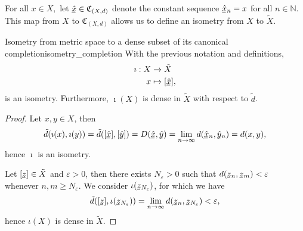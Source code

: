 For all \(x \in X,\) let \(\sequnder{\hat{x}} \in \mathfrak{C}_{(X,d)}\) denote the constant sequence \(\sequnder{\hat{x}}_n = x\) for all \(n \in \mathbb{N}\). This map from \(X\) to \(\mathfrak{C}_{(X,d)}\) allows us to define an isometry from \(X\) to \(\tilde{X}\).
\begin{lemma}{Isometry from metric space to a dense subset of its canonical completion}{isometry_completion}
    With the previous notation and definitions, 
    \begin{align*}
        \imath : X &\to \tilde{X}\\
        x &\mapsto [\sequnder{\hat{x}}],
    \end{align*}
    is an isometry. Furthermore, \(\imath(X)\) is dense in \(\tilde{X}\) with respect to \(\tilde{d}\).
\end{lemma}
\begin{proof}
    Let \(x, y \in X\), then
    \begin{equation*}
        \tilde{d}(\imath(x), \imath(y)) = \tilde{d}([\sequnder{\hat{x}}], [\sequnder{\hat{y}}]) = D(\sequnder{\hat{x}}, \sequnder{\hat{y}}) = \lim_{n\to\infty}{d(\sequnder{\hat{x}}_n,\sequnder{\hat{y}}_n)} = d(x,y),
    \end{equation*}
    hence \(\imath\) is an isometry.

    Let \([\sequnder{z}] \in \tilde{X}\) and \(\varepsilon > 0\), then there exists \(N_\varepsilon > 0\) such that \(d(\sequnder{z}_n,  \sequnder{z}_m) < \varepsilon\) whenever \(n, m \geq N_\varepsilon\). We consider \(\iota(\sequnder{z}_{N_\varepsilon})\), for which we have
    \begin{equation*}
        \tilde{d}([\sequnder{z}], \iota(\sequnder{z}_{N_\varepsilon})) = \lim_{n\to\infty} d(\sequnder{z}_n, \sequnder{z}_{N_\varepsilon}) < \varepsilon,
    \end{equation*}
    hence \(\iota(X)\) is dense in \(\tilde{X}\).
\end{proof}

